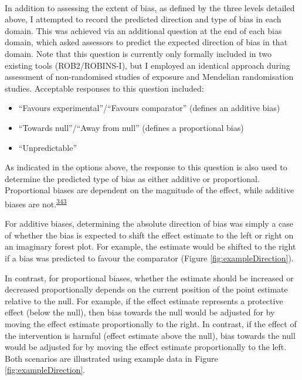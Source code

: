 \documentclass[a4paper, twoside]{templates/ociamthesis}
\providecommand{\tightlist}{%
  \setlength{\itemsep}{0pt}\setlength{\parskip}{0pt}}
\begin{document}
~

In addition to assessing the extent of bias, as defined by the three levels detailed above, I attempted to record the predicted direction and type of bias in each domain. This was achieved via an additional question at the end of each bias domain, which asked assessors to predict the expected direction of bias in that domain. Note that this question is currently only formally included in two existing tools (ROB2/ROBINS-I), but I employed an identical approach during assessment of non-randomised studies of exposure and Mendelian randomisation studies. Acceptable responses to this question included:

\begin{itemize}
\tightlist
\item
  ``Favours experimental''/``Favours comparator'' (defines an additive bias)
\item
  ``Towards null''/``Away from null'' (defines a proportional bias)
\item
  ``Unpredictable''
\end{itemize}

As indicated in the options above, the response to this question is also used to determine the predicted type of bias as either additive or proportional. Proportional biases are dependent on the magnitude of the effect, while additive biases are not.\textsuperscript{\protect\hyperlink{ref-turner2009}{343}}

For additive biases, determining the absolute direction of bias was simply a case of whether the bias is expected to shift the effect estimate to the left or right on an imaginary forest plot. For example, the estimate would be shifted to the right if a bias was predicted to favour the comparator (Figure \ref{fig:exampleDirection}).

In contrast, for proportional biases, whether the estimate should be increased or decreased proportionally depends on the current position of the point estimate relative to the null. For example, if the effect estimate represents a protective effect (below the null), then bias towards the null would be adjusted for by moving the effect estimate proportionally to the right. In contrast, if the effect of the intervention is harmful (effect estimate above the null), bias towards the null would be adjusted for by moving the effect estimate proportionally to the left. Both scenarios are illustrated using example data in Figure \ref{fig:exampleDirection}.
\end{document}
